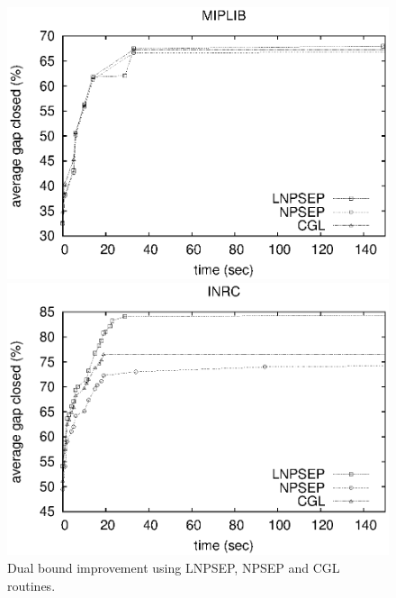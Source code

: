 \documentclass{endm}
\begin{document}
\begin{figure}	
	\begin{minipage}[h]{.5\textwidth}
		\begin{center}
			\includegraphics[width=1\textwidth]{miplib.eps}
		\end{center}
	\end{minipage}
	\begin{minipage}[h]{.5\textwidth}
		\begin{center}
			\includegraphics[width=1\textwidth]{nurse.eps}
		\end{center}
	\end{minipage}
	\caption{Dual bound improvement using LNPSEP, NPSEP and CGL routines.}
	\label{figExperiments}
\end{figure}
\end{document}
